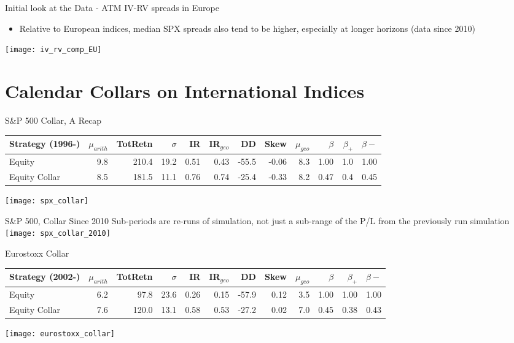 \documentclass{beamer}
\begin{document}
\begin{frame}{Initial look at the Data - ATM IV-RV spreads in Europe}

\begin{itemize}
\item Relative to European indices, median SPX spreads also tend to be higher, especially at longer horizons (data since 2010)
\end{itemize}

\texttt{[image: iv\_rv\_comp\_EU]}

\end{frame}

\section{Calendar Collars on International Indices}

\begin{frame}{S\&P 500 Collar, A Recap}

\scalebox{0.65} {

\begin{tabular}{lrrrrrrrrrrr}
\toprule
Strategy (1996-) & $\mu_{arith}$ & TotRetn & $\sigma$ & IR & IR$_{geo}$ & DD & Skew & $\mu_{geo}$ & $\beta$ & $\beta_+$ & $\beta-$ \\
\midrule
Equity & 9.8 & 210.4 & 19.2 & 0.51 & 0.43 & -55.5 & -0.06 & 8.3 & 1.00 & 1.0 & 1.00\\
Equity Collar & 8.5 & 181.5 & 11.1 & 0.76 & 0.74 & -25.4 & -0.33 & 8.2 & 0.47 & 0.4 & 0.45\\
\bottomrule
\end{tabular}


}

\texttt{[image: spx\_collar]}
\end{frame}

\begin{frame}{S\&P 500, Collar Since 2010}
Sub-periods are re-runs of simulation, not just a sub-range of the P/L from the previously run simulation
\texttt{[image: spx\_collar\_2010]}
\end{frame}



\begin{frame}{Eurostoxx Collar}

\scalebox{0.65} {

\begin{tabular}{lrrrrrrrrrrr}
\toprule
Strategy (2002-) & $\mu_{arith}$ & TotRetn & $\sigma$ & IR & IR$_{geo}$ & DD & Skew & $\mu_{geo}$ & $\beta$ & $\beta_+$ & $\beta-$ \\
\midrule
Equity & 6.2 & 97.8 & 23.6 & 0.26 & 0.15 & -57.9 & 0.12 & 3.5 & 1.00 & 1.00 & 1.00\\
Equity Collar & 7.6 & 120.0 & 13.1 & 0.58 & 0.53 & -27.2 & 0.02 & 7.0 & 0.45 & 0.38 & 0.43\\
\bottomrule
\end{tabular}
}

\texttt{[image: eurostoxx\_collar]}
\end{frame}
\end{document}
